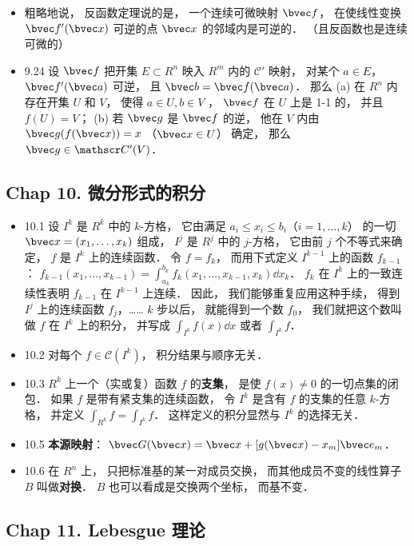 \begin{itemize}
\item 粗略地说， 反函数定理说的是， 一个连续可微映射 $\bvec f$， 在使线性变换 $\bvec f'(\bvec x)$ 可逆的点 $\bvec x$ 的邻域内是可逆的． （且反函数也是连续可微的）

\item 9.24 设 $\bvec f$ 把开集 $E\subset R^n$ 映入 $R^m$ 内的 $\mathscr C'$ 映射， 对某个 $a\in E$， $\bvec f'(\bvec a)$ 可逆， 且 $\bvec b = \bvec f(\bvec a)$． 那么 (a) 在 $R^n$ 内存在开集 $U$ 和 $V$， 使得 $a\in U, b\in V$ ， $\bvec f$ 在 $U$ 上是 1-1 的， 并且 $f(U) = V$； (b) 若 $\bvec g$ 是 $\bvec f$ 的逆， 他在 $V$ 内由 $\bvec g(f(\bvec x)) = x$ （$\bvec x\in U$） 确定， 那么 $\bvec g\in \mathscr C'(V)$．
\end{itemize}

\subsection{Chap 10. 微分形式的积分}

\begin{itemize}
\item 10.1 设 $I^k$ 是 $R^k$ 中的 $k$-方格， 它由满足 $a_i\leqslant x_i \leqslant b_i$（$i=1,\dots,k$） 的一切 $\bvec x=(x_1,\dots,x_k)$ 组成， $I^j$ 是 $R^j$ 中的 $j$-方格， 它由前 $j$ 个不等式来确定， $f$ 是 $I^k$ 上的连续函数． 令 $f = f_k$， 而用下式定义 $I^{k-1}$ 上的函数 $f_{k-1}$： $f_{k-1}(x_1,\dots,x_{k-1}) = \int_{a_k}^{b_k} f_k(x_1,\dots,x_{k-1},x_k)\dd{x_k}$． $f_k$ 在 $I^k$ 上的一致连续性表明 $f_{k-1}$ 在 $I^{k-1}$ 上连续． 因此， 我们能够重复应用这种手续， 得到 $I^j$ 上的连续函数 $f_j$，…… $k$ 步以后， 就能得到一个数 $f_0$， 我们就把这个数叫做 $f$ 在 $I^k$ 上的积分， 并写成 $\int_{I^k} f(x)\dd{x}$ 或者 $\int_{I^k} f$．

\item 10.2 对每个 $f\in \mathscr C(I^k)$， 积分结果与顺序无关．

\item 10.3 $R^k$ 上一个（实或复）函数 $f$ 的\textbf{支集}， 是使 $f(x)\ne 0$ 的一切点集的闭包． 如果 $f$ 是带有紧支集的连续函数， 令 $I^k$ 是含有 $f$ 的支集的任意 $k$-方格， 并定义 $\int_{R^k}f = \int_{I^k}f$． 这样定义的积分显然与 $I^k$ 的选择无关．

\item 10.5 \textbf{本源映射}： $\bvec G(\bvec x) = \bvec x + [g(\bvec x)-x_m]\bvec e_m$．

\item 10.6 在 $R^n$ 上， 只把标准基的某一对成员交换， 而其他成员不变的线性算子 $B$ 叫做\textbf{对换}． $B$ 也可以看成是交换两个坐标， 而基不变．
\end{itemize}


\subsection{Chap 11. Lebesgue 理论}
